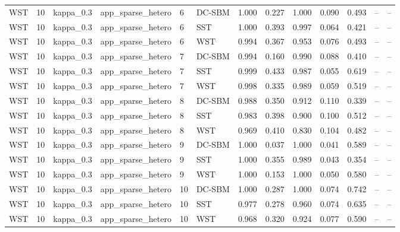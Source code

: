 \begin{table}[!h]
\begin{tabular}[t]{lllllllllllll}
WST & 10 & kappa_0.3 & app_sparse_hetero & 6 & DC-SBM & 1.000 & 0.227 & 1.000 & 0.090 & 0.493 & -- & --\\
WST & 10 & kappa_0.3 & app_sparse_hetero & 6 & SST & 1.000 & 0.393 & 0.997 & 0.064 & 0.421 & -- & --\\
WST & 10 & kappa_0.3 & app_sparse_hetero & 6 & WST & 0.994 & 0.367 & 0.953 & 0.076 & 0.493 & -- & --\\
WST & 10 & kappa_0.3 & app_sparse_hetero & 7 & DC-SBM & 0.994 & 0.160 & 0.990 & 0.088 & 0.410 & -- & --\\
WST & 10 & kappa_0.3 & app_sparse_hetero & 7 & SST & 0.999 & 0.433 & 0.987 & 0.055 & 0.619 & -- & --\\
WST & 10 & kappa_0.3 & app_sparse_hetero & 7 & WST & 0.998 & 0.335 & 0.989 & 0.059 & 0.519 & -- & --\\
WST & 10 & kappa_0.3 & app_sparse_hetero & 8 & DC-SBM & 0.988 & 0.350 & 0.912 & 0.110 & 0.339 & -- & --\\
WST & 10 & kappa_0.3 & app_sparse_hetero & 8 & SST & 0.983 & 0.398 & 0.900 & 0.100 & 0.512 & -- & --\\
WST & 10 & kappa_0.3 & app_sparse_hetero & 8 & WST & 0.969 & 0.410 & 0.830 & 0.104 & 0.482 & -- & --\\
WST & 10 & kappa_0.3 & app_sparse_hetero & 9 & DC-SBM & 1.000 & 0.037 & 1.000 & 0.041 & 0.589 & -- & --\\
WST & 10 & kappa_0.3 & app_sparse_hetero & 9 & SST & 1.000 & 0.355 & 0.989 & 0.043 & 0.354 & -- & --\\
WST & 10 & kappa_0.3 & app_sparse_hetero & 9 & WST & 1.000 & 0.153 & 1.000 & 0.050 & 0.580 & -- & --\\
WST & 10 & kappa_0.3 & app_sparse_hetero & 10 & DC-SBM & 1.000 & 0.287 & 1.000 & 0.074 & 0.742 & -- & --\\
WST & 10 & kappa_0.3 & app_sparse_hetero & 10 & SST & 0.977 & 0.278 & 0.960 & 0.074 & 0.635 & -- & --\\
WST & 10 & kappa_0.3 & app_sparse_hetero & 10 & WST & 0.968 & 0.320 & 0.924 & 0.077 & 0.590 & -- & --\\
\bottomrule
\end{tabular}
\end{table}
